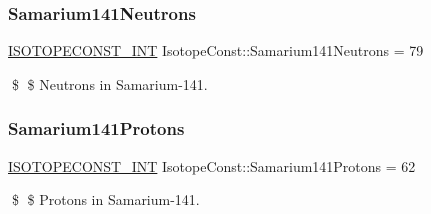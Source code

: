 \subsubsection{\texorpdfstring{Samarium141\+Neutrons}{Samarium141Neutrons}}
{\footnotesize\ttfamily \mbox{\hyperlink{group___isotope_const-_macros_ga5f18360b3e99483a35c32d789e62621c}{I\+S\+O\+T\+O\+P\+E\+C\+O\+N\+S\+T\+\_\+\+I\+NT}} Isotope\+Const\+::\+Samarium141\+Neutrons = 79}

\$ \$ Neutrons in Samarium-\/141. \mbox{\label{group___isotope_const-_samarium-_sm141_ga7a82da0a945d19f1fa54069d5fcdda1d}} 
\subsubsection{\texorpdfstring{Samarium141\+Protons}{Samarium141Protons}}
{\footnotesize\ttfamily \mbox{\hyperlink{group___isotope_const-_macros_ga5f18360b3e99483a35c32d789e62621c}{I\+S\+O\+T\+O\+P\+E\+C\+O\+N\+S\+T\+\_\+\+I\+NT}} Isotope\+Const\+::\+Samarium141\+Protons = 62}

\$ \$ Protons in Samarium-\/141. 